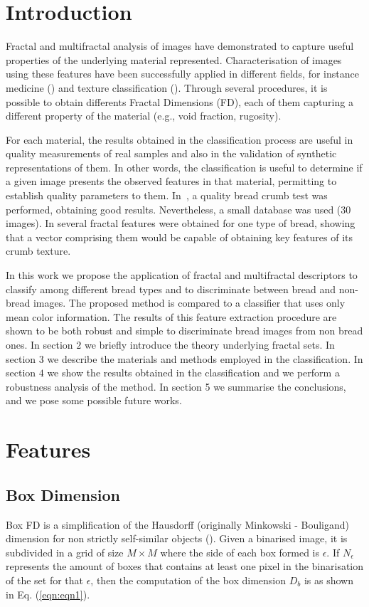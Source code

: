 \documentclass[oneside,a4paper,english,links]{amca}
\begin{document}
\section{Introduction}
Fractal and multifractal analysis of images have demonstrated to capture useful properties of the underlying material represented. Characterisation of images using these features have been successfully applied in different fields, for instance medicine (\cite{Andjelkovic2008,Yu2011}) and texture classification (\cite{Wendt2009}). Through several procedures, it is possible to obtain differents Fractal Dimensions (FD), each of them capturing a different property of the material (e.g., void fraction, rugosity).

For each material, the results obtained in the classification process are useful in quality measurements of real samples and also in the validation of synthetic representations of them. In other words, the classification is useful to determine if a given image presents the observed features in that material, permitting to establish quality parameters to them. In~\cite{Fan2006}, a quality bread crumb test was performed, obtaining good results. Nevertheless, a small database was used ($30$ images). In \cite{Gonzales2008} several fractal features were obtained for one type of bread, showing that a vector comprising them would be capable of obtaining key features of its crumb texture.

In this work we propose the application of fractal and multifractal descriptors to classify among different bread types and to discriminate between bread and non-bread images. The proposed method is compared to a classifier that uses only mean color information. The results of this feature extraction procedure are shown to be both robust and simple to discriminate bread images from non bread ones. In section $2$ we briefly introduce the theory underlying fractal sets. In section $3$ we describe the materials and methods employed in the classification. In section $4$ we show the results obtained in the classification and we perform a robustness analysis of the method. In section 5 we summarise the conclusions, and we pose some possible future works.

\section{Features}
\subsection{Box Dimension}
Box FD is a simplification of the Hausdorff (originally Minkowski - Bouligand) dimension for non strictly self-similar objects (\cite{Peitgen2004}). Given a binarised image, it is subdivided in a grid of size $M\times M$ where the side of each box formed is $\epsilon$. If $N_{\epsilon}$ represents the amount of boxes that contains at least one pixel in the binarisation of the set for that $\epsilon$, then the computation of the box dimension  $D_{b}$ is as shown in Eq. (\ref{eqn:eqn1}).
\end{document}
